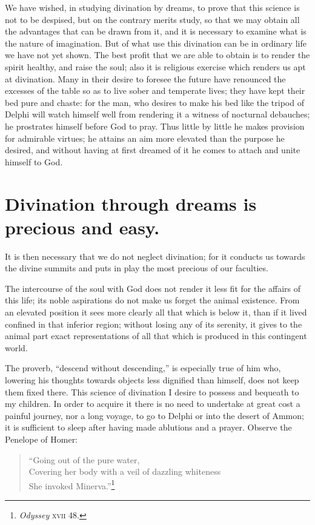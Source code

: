 \documentclass[12pt]{article}
\begin{document}
We have wished, in studying divination by dreams, to prove that this science is
not to be despised, but on the contrary merits study, so that we may obtain all
the advantages that can be drawn from it, and it is necessary to examine what
is the nature of imagination. But of what use this divination can be in
ordinary life we have not yet shown. The best profit that we are able to obtain
is to render the spirit healthy, and raise the soul; also it is religious
exercise which renders us apt at divination. Many in their desire to foresee
the future have renounced the excesses of the table so as to live sober and
temperate lives; they have kept their bed pure and chaste: for the man, who
desires to make his bed like the tripod of Delphi will watch himself well from
rendering it a witness of nocturnal debauches; he prostrates himself before God
to pray. Thus little by little he makes provision for admirable virtues; he
attains an aim more elevated than the purpose he desired, and without having
at first dreamed of it he comes to attach and unite himself to God.


\section{Divination through dreams is precious and easy.}

It is then necessary that we do not neglect divination; for it conducts us
towards the divine summits and puts in play the most precious of our faculties.

The intercourse of the soul with God does not render it less fit for the
affairs of this life; its noble aspirations do not make us forget the animal
existence. From an elevated position it sees more clearly all that which is
below it, than if it lived confined in that inferior region; without losing any
of its serenity, it gives to the animal part exact representations of all that
which is produced in this contingent world.

The proverb, ``descend without descending,'' is especially true of him who,
lowering his thoughts towards objects less dignified than himself, does not
keep them fixed there. This science of divination I desire to possess and
bequeath to my children. In order to acquire it there is no need to undertake
at great cost a painful journey, nor a long voyage, to go to Delphi or into the
desert of Ammon; it is sufficient to sleep after having made ablutions and a
prayer. Observe the Penelope of Homer:

\begin{verse}
``Going out of the pure water,\\
Covering her body with a veil of dazzling whiteness\\
She invoked Minerva.''\footnote{\textit{Odyssey} \textsc{xvii} 48.}
\end{verse}
\end{document}
